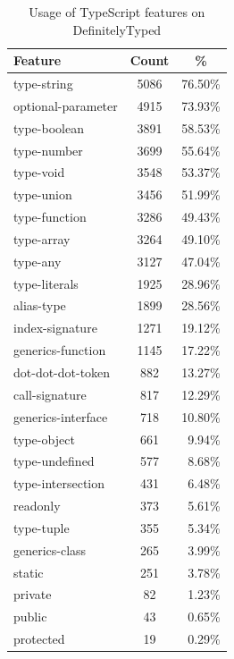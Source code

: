 \documentclass[sigplan,screen]{acmart}
\begin{document}
\begin{table}[tp]
  \caption{Usage of TypeScript features on DefinitelyTyped}
  \begin{center}
    \begin{tabular}{ |l|c|r| } 
      \hline
      \textbf{Feature} & \textbf{Count} & \multicolumn{1}{|c|}{\textbf{\%}} \\ 
      \hline
      type-string & 5086 & 76.50\% \\
      optional-parameter & 4915 & 73.93\% \\
      type-boolean & 3891 & 58.53\% \\
      type-number & 3699 & 55.64\% \\
      type-void & 3548 & 53.37\% \\
      type-union & 3456 & 51.99\% \\
      type-function & 3286 & 49.43\% \\
      type-array & 3264 & 49.10\% \\
      type-any & 3127 & 47.04\% \\
      type-literals & 1925 & 28.96\% \\
      alias-type & 1899 & 28.56\% \\
      index-signature & 1271 & 19.12\% \\
      generics-function & 1145 & 17.22\% \\
      dot-dot-dot-token & 882 & 13.27\% \\
      call-signature & 817 & 12.29\% \\
      generics-interface & 718 & 10.80\% \\
      type-object & 661 & 9.94\% \\
      type-undefined & 577 & 8.68\% \\
      type-intersection & 431 & 6.48\% \\
      readonly & 373 & 5.61\% \\
      type-tuple & 355 & 5.34\% \\
      generics-class & 265 & 3.99\% \\
      static & 251 & 3.78\% \\
      private & 82 & 1.23\% \\
      public & 43 & 0.65\% \\
      protected & 19 & 0.29\% \\
      \hline
    \end{tabular}
  \end{center}
  \label{tab:dts-parse-stats}
\end{table}
\end{document}
